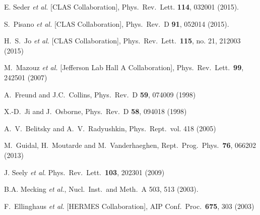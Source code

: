 \documentclass[nofootinbib,twocolumn,showpacs,prl,superscriptaddress,secnumarabic,amssymb,nobibnotes,aps,floatfix]{revtex4}
\begin{document}
\begin{thebibliography}{99}
E. Seder {\it et al.} [CLAS Collaboration],
Phys.\ Rev.\ Lett. {\bf 114}, 032001 (2015).

S.~Pisano {\it et al.} [CLAS Collaboration],
Phys.\ Rev.\ D {\bf 91}, 052014 (2015).

 H.~S.~Jo {\it et al.} [CLAS Collaboration],
  Phys.\ Rev.\ Lett.\  {\bf 115}, no. 21, 212003 (2015)

  M.~Mazouz {\it et al.} [Jefferson Lab Hall A Collaboration],
   Phys.\ Rev.\ Lett.\  {\bf 99}, 242501 (2007)

A.~Freund and J.C.~Collins, Phys.\ Rev.\ D {\bf 59}, 074009 (1998)

   X.-D.~Ji and J.~Osborne, Phys.\ Rev.\ D {\bf 58}, 094018 (1998)

A.~V.~Belitsky and A.~V.~Radyushkin, Phys.\ Rept.\ vol. 418 (2005)

 M.~Guidal, H.~Moutarde and M.~Vanderhaeghen,
 Rept.\ Prog.\ Phys.\  {\bf 76}, 066202 (2013)

 J. Seely {\it et al.} Phys.\ Rev.\ Lett.\ {\bf 103}, 202301 (2009)

   B.A. Mecking {\it et al.}, Nucl.\ Inst.\ and Meth.\ A 503, 513 (2003).

 F.~Ellinghaus {\it et al.} [HERMES Collaboration],
  AIP Conf.\ Proc.\  {\bf 675}, 303 (2003)

\end{thebibliography}
\end{document}
